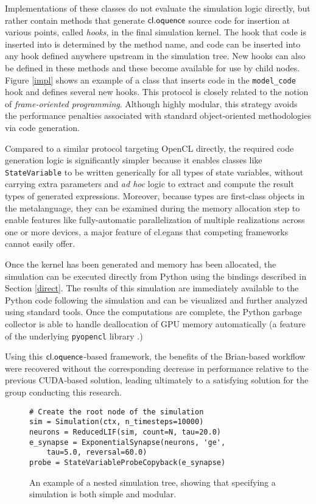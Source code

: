 \documentclass[10pt, conference, compsocconf]{IEEEtran}
\begin{document}
Implementations of these classes do not evaluate the simulation logic directly, but rather contain methods that generate $\textsf{cl.oquence}$ source code for insertion at various points, called {\it hooks}, in the final simulation kernel. The hook that code is inserted into is determined by the method name, and code can be inserted into any hook defined anywhere upstream in the simulation tree. New hooks can also be defined in these methods and these become available for use by child nodes. Figure \ref{impl} shows an example of a class that inserts code in the \verb|model_code| hook and defines several new hooks. This protocol is closely related to the notion of {\it frame-oriented programming}. Although highly modular, this strategy avoids the performance penalties associated with standard object-oriented methodologies via code generation.

Compared to a similar protocol targeting OpenCL directly, the required code generation logic is significantly simpler because it enables classes like \verb|StateVariable| to be written generically for all types of state variables, without carrying extra parameters and {\it ad hoc} logic to extract and compute the result types of generated expressions. Moreover, because types are first-class objects in the metalanguage, they can be examined during the memory allocation step to enable features like fully-automatic parallelization of multiple realizations across one or more devices, a major feature of {\sf cl.egans} that competing frameworks cannot easily offer.


Once the kernel has been generated and memory has been allocated, the simulation can be executed directly from Python using the bindings described in Section \ref{direct}. The results of this simulation are immediately available to the Python code following the simulation and can be visualized and further analyzed using standard tools. Once the computations are complete, the Python garbage collector is able to handle deallocation of GPU memory automatically (a feature of the underlying \verb|pyopencl| library \cite{klockner2011pycuda}.)

Using this $\textsf{cl.oquence}$-based framework, the benefits of the Brian-based workflow were recovered without the  corresponding decrease in performance relative to the previous CUDA-based solution, leading ultimately to a satisfying solution for the group conducting this research.

\begin{figure}
\small{
\begin{verbatim}
# Create the root node of the simulation
sim = Simulation(ctx, n_timesteps=10000)
neurons = ReducedLIF(sim, count=N, tau=20.0)
e_synapse = ExponentialSynapse(neurons, 'ge',
    tau=5.0, reversal=60.0)
probe = StateVariableProbeCopyback(e_synapse)
\end{verbatim}}
\caption{An example of a nested simulation tree, showing that specifying a simulation is both simple and modular.}
\label{spec}
\end{figure}
\end{document}
